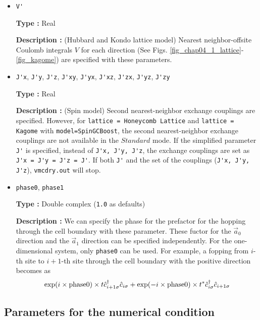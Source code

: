 \begin{itemize}
\item \verb|V'|

{\bf Type :} Real

{\bf Description :} (Hubbard and Kondo lattice model)
Nearest neighbor-offsite Coulomb integrals $V$
 for each direction
(See Figs. \ref{fig_chap04_1_lattice}-\ref{fig_kagome})
are specified with these parameters.

\item \verb|J'x|, \verb|J'y|, \verb|J'z|, \verb|J'xy|, 
  \verb|J'yx|, \verb|J'xz|, \verb|J'zx|, \verb|J'yz|, \verb|J'zy|

{\bf Type :} Real

{\bf Description :} (Spin model)
Second nearest-neighbor exchange couplings are specified.
However, for \verb|lattice = Honeycomb Lattice| and  \verb|lattice = Kagome|
with \verb|model=SpinGCBoost|,
the second nearest-neighbor exchange couplings are not available in the $Standard$ mode.
If the simplified parameter \verb|J'| is specified, instead of
\verb|J'x, J'y, J'z|,
the exchange couplings are set as
\verb|J'x = J'y = J'z = J'|.
If both \verb|J'| and the set of the couplings (\verb|J'x, J'y, J'z|),
\verb|vmcdry.out| will stop.

\item \verb|phase0|, \verb|phase1|

  {\bf Type :} Double complex (\verb|1.0| as defaults)
  
  {\bf Description :}
  We can specify the phase for the prefactor for the hopping through the cell boundary
  with these parameter.
  These fuctor for the $\vec{a}_0$ direction and the $\vec{a}_1$ direction can be specified independently.
  For the one-dimensional system, only \verb|phase0| can be used.
  For example, a fopping from $i$-th site to $i+1$-th site through the cell boundary with the positive direction
  becomes as 
  \begin{align}
    \exp(i \times {\rm phase0}) \times t {\hat c}_{i+1 \sigma}^\dagger {\hat c}_{i \sigma}
    + \exp(-i \times {\rm phase0}) \times t^* {\hat c}_{i \sigma}^\dagger {\hat c}_{i+1 \sigma}
  \end{align}

\end{itemize}

\subsection{Parameters for the numerical condition}


